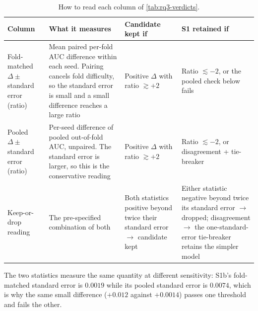 \begin{table}[htbp]
\centering
\footnotesize
\caption{How to read each column of \autoref{tab:rq3-verdicts}.}
\label{tab:rq3-col-guide}
\begin{tabularx}{\textwidth}{@{}p{3.3cm}Xp{2.5cm}p{2.5cm}@{}}
\toprule
Column & What it measures & Candidate kept if & S1 retained if \\
\midrule
Fold-matched $\Delta \pm$ standard error (ratio) &
  Mean paired per-fold \ac{AUC} difference within each seed. Pairing cancels fold
  difficulty, so the standard error is small and a small difference reaches a large ratio &
  Positive $\Delta$ with ratio $\gtrsim +2$ &
  Ratio $\lesssim -2$, or the pooled check below fails \\[4pt]
Pooled $\Delta \pm$ standard error (ratio) &
  Per-seed difference of pooled out-of-fold \ac{AUC}, unpaired. The standard error is
  larger, so this is the conservative reading &
  Positive $\Delta$ with ratio $\gtrsim +2$ &
  Ratio $\lesssim -2$, or disagreement + tie-breaker \\[4pt]
Keep-or-drop reading &
  The pre-specified combination of both &
  Both statistics positive beyond twice their standard error $\to$ candidate kept &
  Either statistic negative beyond twice its standard error $\to$ dropped; disagreement
  $\to$ the one-standard-error tie-breaker retains the simpler model \\
\bottomrule
\end{tabularx}
\end{table}

\noindent
The two statistics measure the same quantity at different sensitivity: S1b's
fold-matched standard error is $0.0019$ while its pooled standard error is $0.0074$, which
is why the same small difference ($+0.012$ against $+0.0014$) passes one threshold and
fails the other.

